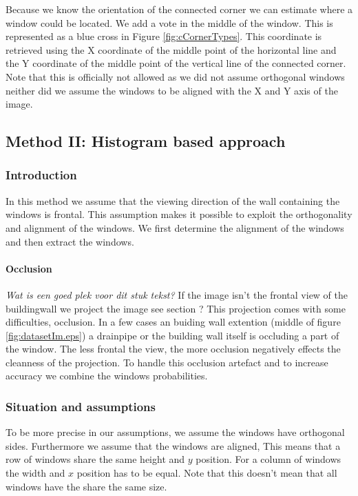 Because we know the orientation of the connected corner we can estimate where
a window could be located.  We add a vote in the middle of the window. 
This is represented as a blue cross in Figure \ref{fig:cCornerTypes}.
This coordinate is retrieved using the X coordinate of the middle point of the horizontal line
and the Y coordinate of the middle point of the vertical line of the connected corner.  
Note that this is officially not allowed as we did not assume orthogonal windows
neither did we assume the windows to be aligned with the X and Y axis of the
image.  



\subsection{Method II: Histogram based approach} 
\subsubsection{Introduction}
In this method we assume that the viewing direction of the wall containing the 
windows is frontal. This assumption makes it possible to exploit the orthogonality and
alignment of the windows. We first determine the alignment of the windows and
then extract the windows. 

\paragraph{Occlusion}
\emph{Wat is een goed plek voor dit stuk tekst?}
\label{lab:occlusion}
If the image isn't the frontal view of the buildingwall we project the image 
see section ?%
This projection comes with some difficulties, occlusion.  In a few cases an
buiding wall extention (middle of figure \ref{fig:datasetIm.eps}) a drainpipe
or the building wall itself is occluding a part of the window.  The less frontal
the view, the more occlusion negatively effects the cleanness of the projection.
To handle this occlusion artefact and to increase accuracy we combine the
windows probabilities.  

\subsubsection{Situation and assumptions}
To be more precise in our assumptions, we assume the windows have orthogonal sides.  Furthermore we
assume that the windows are aligned, This means that a row of windows share the
same height and $y$ position. For a column of windows the width and $x$
position has to be equal.  Note that this doesn't mean that all windows have the
share the same size.

